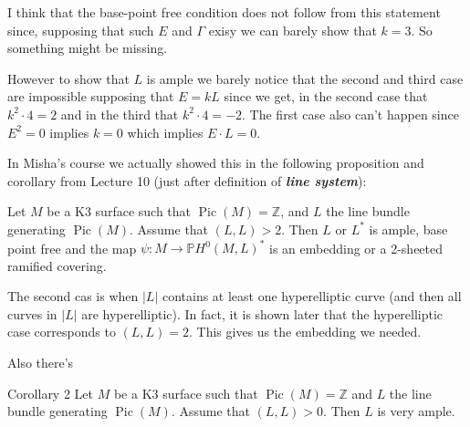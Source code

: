 I think that the base-point free condition does not follow from this statement since, supposing that such $E$ and  $ \Gamma$ exisy we can barely show that $k=3$. So something might be missing.

However to show that  $L$ is ample we barely notice that the second and third case are impossible supposing that  $E=kL$ since we get, in the second case that  $k^2\cdot 4=2$ and in the third that $k^2 \cdot 4=-2$. The first case also can't happen since $E^2=0$ implies $k=0$ which implies  $E\cdot L=0$.

\begin{remark}\leavevmode
	
In Misha's course we actually showed this in the following proposition and corollary from Lecture 10 (just after definition of \textit{\textbf{line system}}):

\begin{thm}\leavevmode
	Let $M$ be a K3 surface such that $\operatorname{Pic}(M) =\mathbb{Z}$, and $L$ the line bundle generating $\operatorname{Pic}(M)$. Assume that $(L,L)>2$. Then $L$ or  $L^*$ is ample, base point free and the map $\psi:M\to \mathbb{P}H^{0}(M,L)^*$ is an embedding or a 2-sheeted ramified covering.
\end{thm}

The second cas is when $|L|$ contains at least one hyperelliptic curve (and then all curves in $|L|$ are hyperelliptic). In fact, it is shown later that the hyperelliptic case corresponds to $(L,L)=2$. This gives us the embedding we needed.

Also there's
\begin{thing5}{Corollary 2}\leavevmode
	Let $M$ be a K3 surface such that $\operatorname{Pic}(M) =\mathbb{Z}$ and $L$ the line bundle generating $\operatorname{Pic}(M)$. Assume that $(L,L)>0$. Then  $L$ is very ample.
\end{thing5}
\end{remark}

